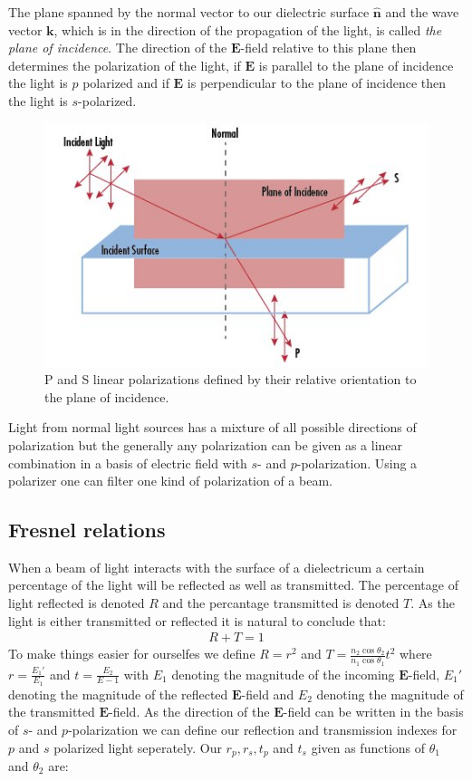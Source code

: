 The plane spanned by the normal vector to our dielectric surface $\hat{\textbf{n}}$ and the wave vector $\textbf{k}$, which is in the direction of the propagation of the light, is called \textit{the plane of incidence}. The direction of the $\textbf{E}$-field relative to this plane then determines the polarization of the light, if $\textbf{E}$ is parallel to the plane of incidence the light is $p$ polarized and if $\textbf{E}$ is perpendicular to the plane of incidence then the light is $s$-polarized. 
%
\begin{figure}[h]
    \centering
    \includegraphics[width=\columnwidth]{plane}
    \caption{P and S linear polarizations defined by their relative orientation to the plane of incidence.}
    \label{fig:planeofincidence}
\end{figure}
\noindent
Light from normal light sources has a mixture of all possible directions of polarization but the generally any polarization can be given as a linear combination in a basis of electric field with $s$- and $p$-polarization. Using a polarizer one can filter one kind of polarization of a beam.

\subsection{Fresnel relations}
When a beam of light interacts with the surface of a dielectricum a certain percentage of the light will be reflected as well as transmitted. The percentage of light reflected is denoted $R$ and the percantage transmitted is denoted $T$. As the light is either transmitted or reflected it is natural to conclude that:
%
\begin{align}
R+T=1
\end{align}
%
To make things easier for ourselfes we define $R=r^2$ and $T=\frac{n_2\cos{\theta_2}}{n_1\cos{\theta_1}}t^2$ where $r=\frac{E_1'}{E_1}$ and  $t=\frac{E_2}{E-1}$ with $E_1$ denoting the magnitude of the incoming $\textbf{E}$-field, $E_1'$ denoting the magnitude of the reflected $\textbf{E}$-field and $E_2$ denoting the magnitude of the transmitted $\textbf{E}$-field. As the direction of the $\textbf{E}$-field can be written in the basis of $s$- and $p$-polarization we can define our reflection and transmission indexes for $p$ and $s$ polarized light seperately. Our $r_p,r_s,t_p$ and $t_s$ given as functions of $\theta_1$ and $\theta_2$ are:

